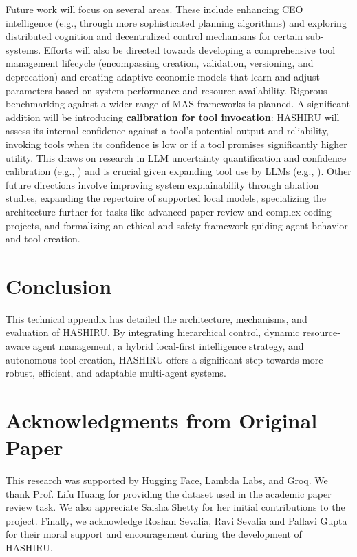 \documentclass[twocolumn]{article}
\begin{document}
Future work will focus on several areas. These include enhancing CEO intelligence (e.g., through more sophisticated planning algorithms) and exploring distributed cognition and decentralized control mechanisms for certain sub-systems. Efforts will also be directed towards developing a comprehensive tool management lifecycle (encompassing creation, validation, versioning, and deprecation) and creating adaptive economic models that learn and adjust parameters based on system performance and resource availability. Rigorous benchmarking against a wider range of MAS frameworks is planned. A significant addition will be introducing \textbf{calibration for tool invocation}: HASHIRU will assess its internal confidence against a tool's potential output and reliability, invoking tools when its confidence is low or if a tool promises significantly higher utility. This draws on research in LLM uncertainty quantification and confidence calibration (e.g., \cite{manggalaqa, spiess2024calibration}) and is crucial given expanding tool use by LLMs (e.g., \cite{Qin2023ToolLLM}). Other future directions involve improving system explainability through ablation studies, expanding the repertoire of supported local models, specializing the architecture further for tasks like advanced paper review and complex coding projects, and formalizing an ethical and safety framework guiding agent behavior and tool creation.

\section{Conclusion}
This technical appendix has detailed the architecture, mechanisms, and evaluation of HASHIRU. By integrating hierarchical control, dynamic resource-aware agent management, a hybrid local-first intelligence strategy, and autonomous tool creation, HASHIRU offers a significant step towards more robust, efficient, and adaptable multi-agent systems.

\hrulefill

\section*{Acknowledgments from Original Paper}
This research was supported by Hugging Face, Lambda Labs, and Groq. We thank Prof. Lifu Huang for providing the dataset used in the academic paper review task. We also appreciate Saisha Shetty for her initial contributions to the project. Finally, we acknowledge Roshan Sevalia, Ravi Sevalia and Pallavi Gupta for their moral support and encouragement during the development of HASHIRU.



\end{document}
